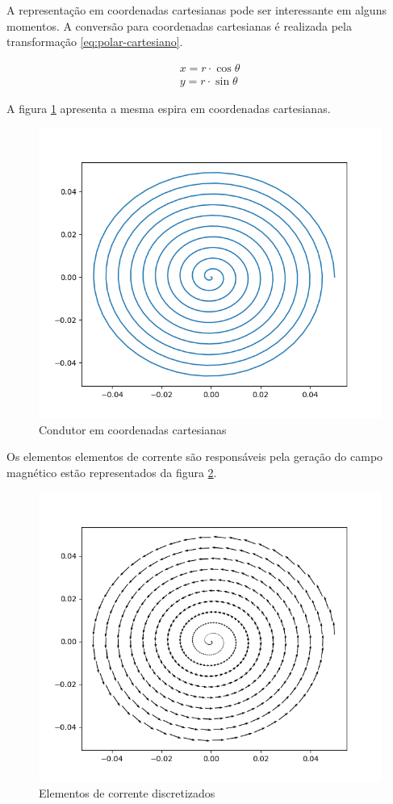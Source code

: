\documentclass[
	article,			%
	11pt,				%
	oneside,			%
	a4paper,			%
	english,			%
	brazil,				%
	sumario=tradicional
	]{abntex2}
\begin{document}
A representação em coordenadas cartesianas pode ser interessante em alguns momentos. A conversão para coordenadas cartesianas é realizada pela transformação \ref{eq:polar-cartesiano}.

\begin{equation} \label{eq:polar-cartesiano}
	\begin{array}{l}
	x = r \cdot \cos \theta\\ 
	y = r \cdot \sin \theta
	\end{array}
\end{equation}

A figura \ref{fig:espiracartesiana} apresenta a mesma espira em coordenadas cartesianas.

\begin{figure}[h]
	\centering
	\includegraphics[width=0.7\linewidth]{figures/espiracartesiana}
	\caption[Condutor em coordenadas cartesianas]{Condutor em coordenadas cartesianas}
	\label{fig:espiracartesiana}
\end{figure}

Os elementos elementos de corrente são responsáveis pela geração do campo magnético estão representados da figura \ref{fig:elementosdecondutor}.

\begin{figure}[h]
	\centering
	\includegraphics[width=0.7\linewidth]{figures/elementosdecondutor}
	\caption[Elementos de corrente discretizados]{Elementos de corrente discretizados}
	\label{fig:elementosdecondutor}
\end{figure}
\end{document}
